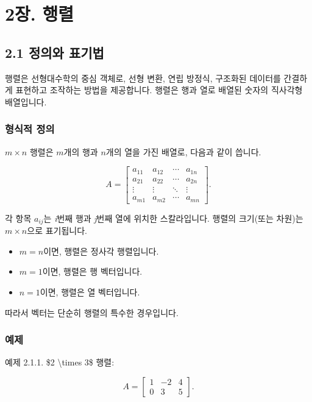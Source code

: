 \documentclass[
  12pt,
  a4paper,
]{article}
\let\oldsection\section
\renewcommand{\section}{\clearpage\oldsection}
\begin{document}
\section{2장. 행렬}\label{chapter-2-matrices}

\subsection{2.1 정의와 표기법}\label{21-definition-and-notation}

행렬은 선형대수학의 중심 객체로, 선형 변환, 연립 방정식, 구조화된 데이터를 간결하게 표현하고 조작하는 방법을 제공합니다. 행렬은 행과 열로 배열된 숫자의 직사각형 배열입니다.

\subsubsection{형식적 정의}\label{formal-definition}

\(m \times n\) 행렬은 \(m\)개의 행과 \(n\)개의 열을 가진 배열로, 다음과 같이 씁니다.

\[A =
\begin{bmatrix}
a_{11} & a_{12} & \cdots & a_{1n} \\
a_{21} & a_{22} & \cdots & a_{2n} \\
\vdots & \vdots & \ddots & \vdots \\
a_{m1} & a_{m2} & \cdots & a_{mn}
\end{bmatrix}.\]

각 항목 \(a_{ij}\)는 \emph{i}번째 행과 \emph{j}번째 열에 위치한 스칼라입니다. 행렬의 크기(또는 차원)는 \(m \times n\)으로 표기됩니다.

\begin{itemize}
\item
  \(m = n\)이면, 행렬은 정사각 행렬입니다.
\item
  \(m = 1\)이면, 행렬은 행 벡터입니다.
\item
  \(n = 1\)이면, 행렬은 열 벡터입니다.
\end{itemize}

따라서 벡터는 단순히 행렬의 특수한 경우입니다.

\subsubsection{예제}\label{examples}

예제 2.1.1. \$2 \textbackslash times 3\$ 행렬:

\[A = \begin{bmatrix}
1 & -2 & 4 \\
0 & 3 & 5
\end{bmatrix}.\]
\end{document}
